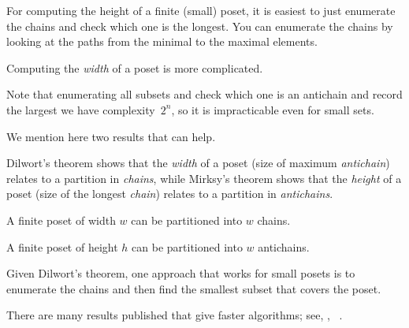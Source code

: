 

\begin{hint}
    For computing the height of a finite (small) poset, it is easiest to just enumerate the chains and check which one is the longest.
    You can enumerate the chains by looking at the paths from the minimal to the maximal elements.
\end{hint}

\begin{hint}
    Computing the \emph{width} of a poset is more complicated.

    Note that enumerating all subsets and check which one is an antichain and record the largest we have complexity~$2^n$, so it is impracticable even for small sets.

    We mention here two results that can help.

    Dilwort's theorem shows that the \emph{width} of a poset (size of maximum \emph{antichain}) relates to a partition in \emph{chains}, while Mirksy's theorem shows that the \emph{height} of a poset (size of the longest \emph{chain}) relates to a partition in \emph{antichains}.

    \begin{theorem}
        \label{thm:dilwort}
        A finite poset of width $w$ can be partitioned into $w$ chains.
    \end{theorem}

    \begin{theorem}
        \label{thm:mirsky}
        A finite poset of height $h$ can be partitioned into $w$ antichains.
    \end{theorem}

    Given Dilwort's theorem, one approach that works for small posets is to enumerate the chains and then find the smallest subset that covers the poset.

    There are many results published that give faster algorithms; see, \eg, ~\cite{chen12decomposition}.

\end{hint}


